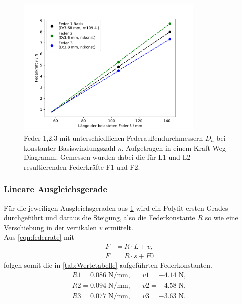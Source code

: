 \begin{figure}[H]
    \center
    \includegraphics[width=0.8\textwidth]{plots/D_kraftweg_dia.pdf}
    \caption{Feder 1,2,3 mit unterschiedlichen Federaußendurchmessern $D_a$ bei konstanter Basiswindungszahl $n$.
    Aufgetragen in einem Kraft-Weg-Diagramm. Gemessen wurden dabei
    die für L1 und L2 resultierenden Federkräfte F1 und F2.}
    \label{tab:LF_D}
\end{figure}
\subsubsection{Lineare Ausgleichsgerade}
\label{sec:fit}
Für die jeweiligen Ausgleichsgeraden aus \ref{tab:LF_D} wird ein Polyfit \cite{numpy_polyfit}
ersten Grades durchgeführt und daraus die Steigung, also die Federkonstante $R$ so wie eine Verschiebung
in der vertikalen $v$ ermittelt.\\
Aus \ref{eqn:federrate} mit
\begin{align*}
  F&=R \cdot L + v ,\\
  F&=R \cdot s + F0
\end{align*}
folgen somit die in \ref{tab:Wertetabelle} aufgeführten Federkonstanten.
\begin{align*}
  R1= 0.086\;\si{\N\per\mm}, &&  v1= -4.14\;\si{\N},\\
  R2= 0.094\;\si{\N\per\mm}, &&  v2= -4.58\;\si{\N},\\
  R3= 0.077\;\si{\N\per\mm}, &&  v3= -3.63\;\si{\N}.\\
\end{align*}

